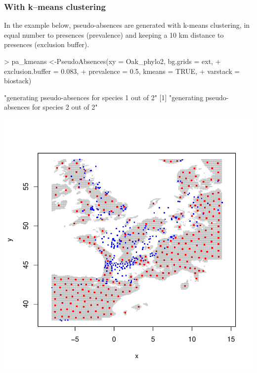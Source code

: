 \documentclass[10pt,a4paper]{article}
\begin{document}
\subsubsection{With k--means clustering}

In the example below, pseudo-absences are generated with k-means clustering, in equal number to presences (prevalence) and keeping a 10 km distance to presences (exclusion buffer).

\begin{Schunk}
\begin{Sinput}
> pa_kmeans <-PseudoAbsences(xy = Oak_phylo2, bg.grids = ext, 
+                            exclusion.buffer = 0.083, 
+                            prevalence = 0.5, kmeans = TRUE, 
+                            varstack = biostack)
\end{Sinput}
\begin{Soutput}
[1] "generating pseudo-absences for species 1 out of 2"
[1] "generating pseudo-absences for species 2 out of 2"
\end{Soutput}
\end{Schunk}
\includegraphics{mopa-mopa10}
\end{document}
